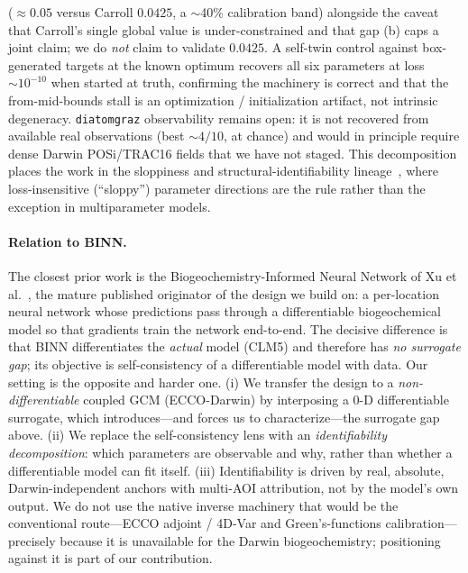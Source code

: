 \documentclass[11pt]{article}
\begin{document}
($\approx0.05$ versus Carroll $0.0425$, a $\sim$40\% calibration band) alongside
the caveat that Carroll's single global value is under-constrained and that gap
(b) caps a joint claim; we do \emph{not} claim to validate $0.0425$. A
self-twin control against box-generated targets at the known optimum recovers all
six parameters at loss $\sim10^{-10}$ when started at truth, confirming the
machinery is correct and that the from-mid-bounds stall is an optimization /
initialization artifact, not intrinsic degeneracy. \texttt{diatomgraz}
observability remains open: it is not recovered from available real observations
(best $\sim4/10$, at chance) and would in principle require dense Darwin
POSi/TRAC16 fields that we have not staged. This decomposition places the work in
the sloppiness and structural-identifiability lineage~\cite{transtrum2012},
where loss-insensitive (``sloppy'') parameter directions are the rule rather
than the exception in multiparameter models.

\paragraph{Relation to BINN.}
The closest prior work is the Biogeochemistry-Informed Neural Network of
Xu et al.~\cite{xu2025binn}, the mature published originator of the design we
build on: a per-location neural network whose predictions pass through a
differentiable biogeochemical model so that gradients train the network
end-to-end. The decisive difference is that BINN differentiates the
\emph{actual} model (CLM5) and therefore has \emph{no surrogate gap}; its
objective is self-consistency of a differentiable model with data. Our setting
is the opposite and harder one. (i) We transfer the design to a
\emph{non-differentiable} coupled GCM (ECCO-Darwin) by interposing a 0-D
differentiable surrogate, which introduces---and forces us to characterize---the
surrogate gap above. (ii) We replace the self-consistency lens with an
\emph{identifiability decomposition}: which parameters are observable and why,
rather than whether a differentiable model can fit itself. (iii) Identifiability
is driven by real, absolute, Darwin-independent anchors with multi-AOI
attribution, not by the model's own output. We do not use the native inverse
machinery that would be the conventional route---ECCO adjoint / 4D-Var
\cite{heimbach2015, menemenlis2005} and Green's-functions calibration---precisely
because it is unavailable for the Darwin biogeochemistry; positioning against it
is part of our contribution.
\end{document}
